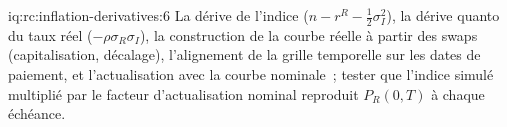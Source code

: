 \begin{solution}{iq:rc:inflation-derivatives:6}
La dérive de l'indice ($n-r^R-\frac12\sigma_I^2$), la dérive quanto du taux réel
($-\rho\sigma_R\sigma_I$), la construction de la courbe réelle à partir des swaps (capitalisation,
décalage), l'alignement de la grille temporelle sur les dates de paiement, et l'actualisation avec la courbe nominale~;
tester que l'indice simulé multiplié par le facteur d'actualisation nominal reproduit $P_R(0,T)$ à chaque
échéance.
\end{solution}
